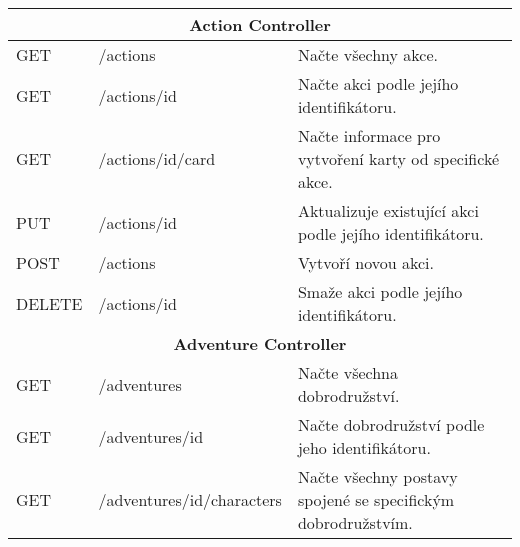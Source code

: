 \begin{longtable}{|l|l|p{}|}
    \multicolumn{3}{|c|}{\textbf{Action Controller}}                                                                                                                                                      \\
    \hline
    GET             & /actions                               & Načte všechny akce.                                                                                                                        \\
    GET             & /actions/{id}                          & Načte akci podle jejího identifikátoru.                                                                                                    \\
    GET             & /actions/{id}/card                     & Načte informace pro vytvoření karty od specifické akce.                                                                                    \\
    PUT             & /actions/{id}                          & Aktualizuje existující akci podle jejího identifikátoru.                                                                                   \\
    POST            & /actions                               & Vytvoří novou akci.                                                                                                                        \\
    DELETE          & /actions/{id}                          & Smaže akci podle jejího identifikátoru.                                                                                                    \\
    \hline
    \multicolumn{3}{|c|}{\textbf{Adventure Controller}}                                                                                                                                                   \\
    \hline
    GET             & /adventures                            & Načte všechna dobrodružství.                                                                                                               \\
    GET             & /adventures/{id}                       & Načte dobrodružství podle jeho identifikátoru.                                                                                             \\
    GET             & /adventures/{id}/characters            & Načte všechny postavy spojené se specifickým dobrodružstvím.                                                                               \\

\end{longtable}
